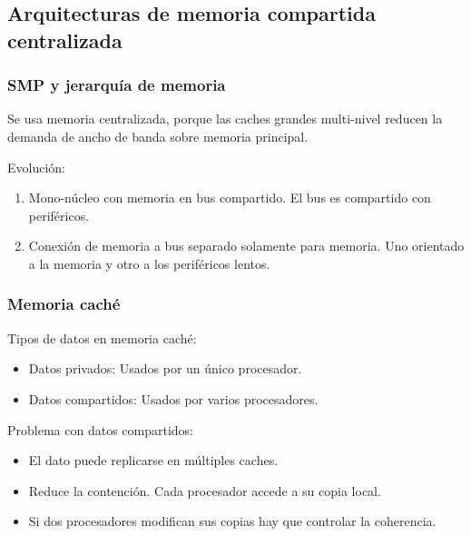 \documentclass[12pt, twoside, openright]{report} %
\begin{document}
\begin{itemize}
     

\subsection{Arquitecturas de memoria compartida centralizada}

\subsubsection{SMP y jerarquía de memoria}



      Se usa memoria centralizada, porque las caches grandes
      multi-nivel reducen la demanda de ancho de banda sobre memoria
      principal.

      Evolución:

      \begin{enumerate}

        
      \item
        Mono-núcleo con memoria en bus compartido. El bus es
        compartido con periféricos.
      \item
        Conexión de memoria a bus separado solamente para memoria. Uno
        orientado a la memoria y otro a los periféricos lentos.
      \end{enumerate}

      
\subsubsection{Memoria caché}


      
      Tipos de datos en memoria caché:

      \begin{itemize}
      
      \item
        Datos privados: Usados por un único procesador.
      \item
        Datos compartidos: Usados por varios procesadores.
      \end{itemize}

      Problema con datos compartidos:

      \begin{itemize}
      
      \item
        El dato puede replicarse en múltiples caches.
      \item
        Reduce la contención. Cada procesador accede a su copia local.
      \item
        Si dos procesadores modifican sus copias hay que controlar la
        coherencia.


\end{itemize}
\end{itemize}
\end{document}
